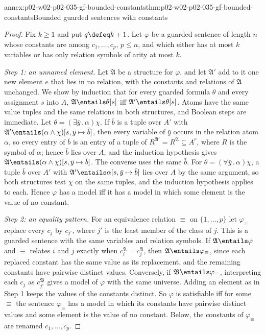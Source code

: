 \begin{annexitem}{annex:p02-w02-p02-035-gf-bounded-constants}{thm:p02-w02-p02-035-gf-bounded-constants}{Bounded guarded sentences with constants}
\begin{proof}
Fix \(k\geq1\) and put \(q\defeq k+1\).  Let \(\varphi\) be a guarded sentence
of length \(n\) whose constants are among \(c_1,\ldots,c_p\), \(p\leq n\), and
which either has at most \(k\) variables or has only relation symbols of
arity at most \(k\).

\emph{Step 1: an unnamed element.}  Let \(\mathfrak A\) be a structure for
\(\varphi\), and let \(\mathfrak A'\) add to it one new element \(e\) that lies
in no relation, with the constants and relations of \(\mathfrak A\)
unchanged.  We show by induction that for every guarded formula \(\theta\)
and every assignment \(s\) into \(A\), \(\mathfrak A\entails\theta[s]\) iff
\(\mathfrak A'\entails\theta[s]\).  Atoms have the same value tuples and the
same relations in both structures, and Boolean steps are immediate.  Let
\(\theta=(\exists\bar y\,.\,\alpha)\chi\).  If \(\bar b\) is a tuple over
\(A'\) with \(\mathfrak A'\entails(\alpha\land\chi)[s,\bar y\mapsto\bar b]\),
then every variable of \(\bar y\) occurs in the relation atom \(\alpha\), so
every entry of \(\bar b\) is an entry of a tuple of
\(R^{\mathfrak A'}=R^{\mathfrak A}\subseteq A^{r}\), where \(R\) is the symbol of
\(\alpha\); hence \(\bar b\) lies over \(A\), and the induction hypothesis gives
\(\mathfrak A\entails(\alpha\land\chi)[s,\bar y\mapsto\bar b]\).  The
converse uses the same \(\bar b\).  For
\(\theta=(\forall\bar y\,.\,\alpha)\chi\), a tuple \(\bar b\) over \(A'\) with
\(\mathfrak A'\entails\alpha[s,\bar y\mapsto\bar b]\) lies over \(A\) by the
same argument, so both structures test \(\chi\) on the same tuples, and the
induction hypothesis applies to each.  Hence \(\varphi\) has a model iff it
has a model in which some element is the value of no constant.

\emph{Step 2: an equality pattern.}  For an equivalence relation \(\equiv\)
on \(\{1,\ldots,p\}\) let \(\varphi_\equiv\) replace every \(c_j\) by
\(c_{j'}\), where \(j'\) is the least member of the class of \(j\).  This is
a guarded sentence with the same variables and relation symbols.  If
\(\mathfrak A\entails\varphi\) and \(\equiv\) relates \(i\) and \(j\) exactly
when \(c_i^{\mathfrak A}=c_j^{\mathfrak A}\), then
\(\mathfrak A\entails\varphi_\equiv\), since each replaced constant has the
same value as its replacement, and the remaining constants have pairwise
distinct values.  Conversely, if \(\mathfrak B\entails\varphi_\equiv\),
interpreting each \(c_j\) as \(c_{j'}^{\mathfrak B}\) gives a model of
\(\varphi\) with the same universe.  Adding an element as in Step 1 keeps the
values of the constants distinct.  So \(\varphi\) is satisfiable iff for some
\(\equiv\) the sentence \(\varphi_\equiv\) has a model in which its constants
have pairwise distinct values and some element is the value of no constant.
Below, the constants of \(\varphi_\equiv\) are renamed \(c_1,\ldots,c_p\).


\end{proof}
\end{annexitem}
